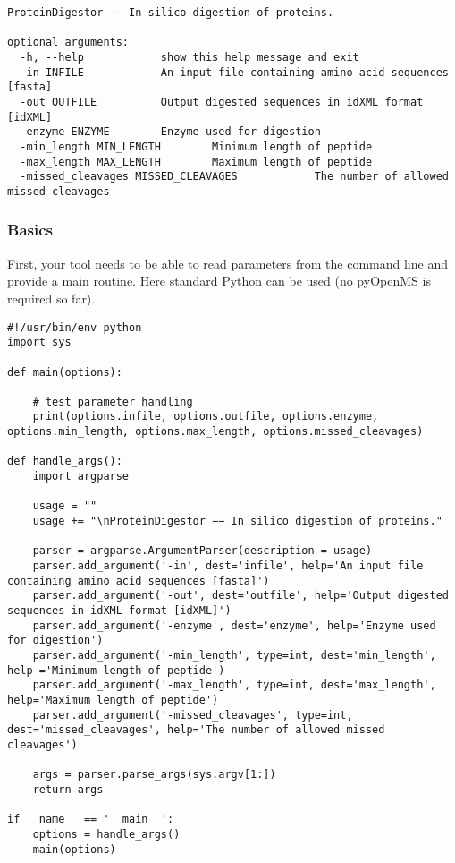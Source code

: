 {\begin{listing}
\begin{verbatim}
ProteinDigestor −− In silico digestion of proteins.

optional arguments:
  -h, --help            show this help message and exit
  -in INFILE            An input file containing amino acid sequences [fasta]
  -out OUTFILE          Output digested sequences in idXML format [idXML]
  -enzyme ENZYME        Enzyme used for digestion
  -min_length MIN_LENGTH		Minimum length of peptide
  -max_length MAX_LENGTH		Maximum length of peptide
  -missed_cleavages MISSED_CLEAVAGES			The number of allowed missed cleavages
\end{verbatim}
\end{listing}

\subsubsection{Basics}
First, your tool needs to be able to read parameters from the command line and provide a main routine. Here standard Python can be used (no pyOpenMS is required so far).

\begin{listing}
\begin{verbatim}
#!/usr/bin/env python
import sys

def main(options):

    # test parameter handling
    print(options.infile, options.outfile, options.enzyme, options.min_length, options.max_length, options.missed_cleavages)

def handle_args():
    import argparse

    usage = ""
    usage += "\nProteinDigestor −− In silico digestion of proteins."

    parser = argparse.ArgumentParser(description = usage)
    parser.add_argument('-in', dest='infile', help='An input file containing amino acid sequences [fasta]')
    parser.add_argument('-out', dest='outfile', help='Output digested sequences in idXML format [idXML]')
    parser.add_argument('-enzyme', dest='enzyme', help='Enzyme used for digestion')
    parser.add_argument('-min_length', type=int, dest='min_length', help ='Minimum length of peptide')
    parser.add_argument('-max_length', type=int, dest='max_length', help='Maximum length of peptide')
    parser.add_argument('-missed_cleavages', type=int, dest='missed_cleavages', help='The number of allowed missed cleavages')

    args = parser.parse_args(sys.argv[1:])
    return args

if __name__ == '__main__':
    options = handle_args()
    main(options)
\end{verbatim}
\end{listing}

}
